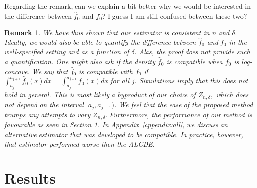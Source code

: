 \documentclass[12pt]{article} %
\newtheorem{remark}[theorem]{Remark}
\newcommand{\comC}[1]{{\noindent  \color{orange}#1}}
\newcommand{\comH}[1]{{\noindent \color{blue}#1}}
\begin{document}
\comC{Regarding the remark, can we explain a bit better why we would be interested in the difference between $\widehat f_0$ and $f_0$? I guess I am still confused between these two?}

\begin{remark}
We have thus shown that our estimator is consistent in $n$ and $\delta.$   Ideally, we would also be able to quantify the difference between $\widehat f_0$ and $f_0$ in the well-specified setting and as a function of $\delta.$  Alas, the proof does not provide such a quantification.  One might also ask if the density $\widehat f_0$ is \emph{compatible} when $f_0$ is log-concave.   We say that $\widehat f_0$ is compatible with $f_0$ if $\int_{a_j}^{a_{j+1}}\widehat f_0(x)dx = \int_{a_j}^{a_{j+1}} f_0(x)dx$ for all $j.$  Simulations imply that this does not hold in general.  %
This is most likely a byproduct of our choice of  $Z_{n,\delta},$ which does not depend on the interval $[a_j, a_{j+1})$.  We feel that the ease of the proposed method trumps any attempts to vary $Z_{n,\delta}.$  Furthermore, the performance of our method is favourable as seen in Section \ref{sec:results}. In Appendix~\ref{appendix:all}, we discuss an alternative estimator that was developed to be compatible.  In practice, however, that estimator performed worse than the ALCDE. 
\end{remark}










\section{Results}
\label{sec:results}
\end{document}
